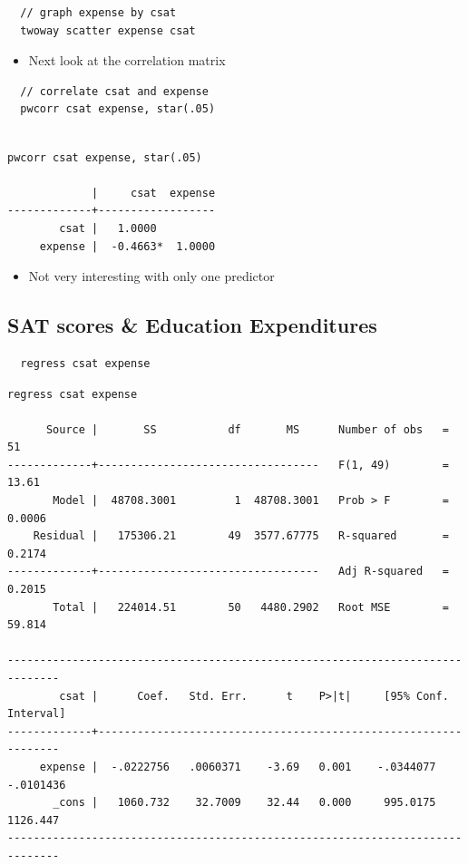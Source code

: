 \documentclass[]{book}
\providecommand{\tightlist}{%
  \setlength{\itemsep}{0pt}\setlength{\parskip}{0pt}}
\begin{document}
\begin{verbatim}
  // graph expense by csat
  twoway scatter expense csat
\end{verbatim}

\begin{itemize}
\tightlist
\item
  Next look at the correlation matrix
\end{itemize}

\begin{verbatim}
  // correlate csat and expense
  pwcorr csat expense, star(.05)
\end{verbatim}

\begin{verbatim}

pwcorr csat expense, star(.05)

             |     csat  expense
-------------+------------------
        csat |   1.0000 
     expense |  -0.4663*  1.0000
\end{verbatim}

\begin{itemize}
\tightlist
\item
  Not very interesting with only one predictor
\end{itemize}

\subsection{SAT scores \& Education
Expenditures}\label{sat-scores-education-expenditures}

\begin{verbatim}
  regress csat expense
\end{verbatim}

\begin{verbatim}
regress csat expense

      Source |       SS           df       MS      Number of obs   =        51
-------------+----------------------------------   F(1, 49)        =     13.61
       Model |  48708.3001         1  48708.3001   Prob > F        =    0.0006
    Residual |   175306.21        49  3577.67775   R-squared       =    0.2174
-------------+----------------------------------   Adj R-squared   =    0.2015
       Total |   224014.51        50   4480.2902   Root MSE        =    59.814

------------------------------------------------------------------------------
        csat |      Coef.   Std. Err.      t    P>|t|     [95% Conf. Interval]
-------------+----------------------------------------------------------------
     expense |  -.0222756   .0060371    -3.69   0.001    -.0344077   -.0101436
       _cons |   1060.732    32.7009    32.44   0.000     995.0175    1126.447
------------------------------------------------------------------------------
\end{verbatim}
\end{document}
